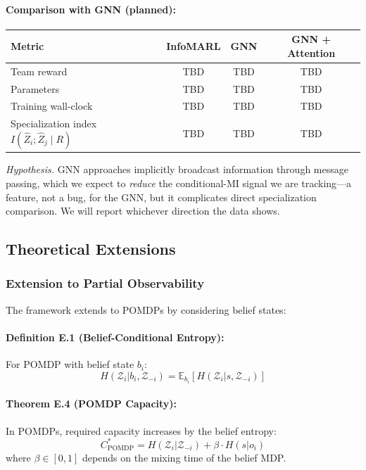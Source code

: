 \documentclass[10pt, letterpaper]{article}
\begin{document}
\paragraph{Comparison with GNN (planned):}

\begin{center}
\begin{tabular}{lccc}
\toprule
\textbf{Metric} & \textbf{InfoMARL} & \textbf{GNN} & \textbf{GNN + Attention} \\
\midrule
Team reward & TBD & TBD & TBD \\
Parameters  & TBD & TBD & TBD \\
Training wall-clock & TBD & TBD & TBD \\
Specialization index $I(\hat{Z}_i;\hat{Z}_j\mid R)$ & TBD & TBD & TBD \\
\bottomrule
\end{tabular}
\end{center}

\emph{Hypothesis.} GNN approaches implicitly broadcast information through message passing, which we expect to \emph{reduce} the conditional-MI signal we are tracking---a feature, not a bug, for the GNN, but it complicates direct specialization comparison. We will report whichever direction the data shows.

\subsection{Theoretical Extensions}

\subsubsection{Extension to Partial Observability}

The framework extends to POMDPs by considering belief states:

\paragraph{Definition E.1 (Belief-Conditional Entropy):} For POMDP with belief state $b_i$:
\[H(\mathcal{Z}_i | b_i, \mathcal{Z}_{-i}) = \mathbb{E}_{b_i} [H(\mathcal{Z}_i | s, \mathcal{Z}_{-i})]\]

\paragraph{Theorem E.4 (POMDP Capacity):} In POMDPs, required capacity increases by the belief entropy:
\[C^*_{\text{POMDP}} = H(\mathcal{Z}_i | \mathcal{Z}_{-i}) + \beta \cdot H(s | o_i)\]
where $\beta \in [0,1]$ depends on the mixing time of the belief MDP.
\end{document}
